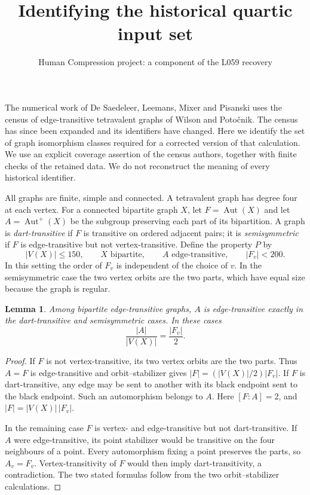 \documentclass[11pt,a4paper]{article}
\title{Identifying the historical quartic input set}
\author{Human Compression project: a component of the L059 recovery}
\date{}
\newtheorem{lemma}{Lemma}
\begin{document}
\maketitle

The numerical work of De Saedeleer, Leemans, Mixer and Pisanski
\cite{l059} uses the census of edge-transitive tetravalent graphs
of Wilson and Poto\v cnik. The census has since been expanded and its
identifiers have changed. Here we identify the set of graph isomorphism
classes required for a corrected version of that calculation. We use
an explicit coverage assertion of the census authors, together with
finite checks of the retained data. We do not reconstruct the meaning
of every historical identifier.

All graphs are finite, simple and connected. A tetravalent graph has
degree four at each vertex. For a connected bipartite graph $X$, let
$F=\operatorname{Aut}(X)$ and let $A=\operatorname{Aut}^{+}(X)$ be
the subgroup preserving each part of its bipartition. A graph is
\emph{dart-transitive} if $F$ is transitive on ordered adjacent pairs;
it is \emph{semisymmetric} if $F$ is edge-transitive but not
vertex-transitive. Define the property $P$ by
\[
 |V(X)|\leq150,\qquad X\text{ bipartite},\qquad
 A\text{ edge-transitive},\qquad |F_v|<200.
 \tag{1}
\]
In this setting the order of $F_v$ is independent of the choice of
$v$. In the semisymmetric case the two vertex orbits are the two
parts, which have equal size because the graph is regular.

\begin{lemma}
Among bipartite edge-transitive graphs, $A$ is edge-transitive
exactly in the dart-transitive and semisymmetric cases. In these
cases
\[
                    \frac{|A|}{|V(X)|}=\frac{|F_v|}{2}.
\]
\end{lemma}
\begin{proof}
If $F$ is not vertex-transitive, its two vertex orbits are the two
parts. Thus $A=F$ is edge-transitive and orbit--stabilizer gives
$|F|=(|V(X)|/2)|F_v|$. If $F$ is dart-transitive, any edge may be
sent to another with its black endpoint sent to the black endpoint.
Such an automorphism belongs to $A$. Here $[F:A]=2$, and
$|F|=|V(X)|\,|F_v|$.

In the remaining case $F$ is vertex- and edge-transitive but not
dart-transitive. If $A$ were edge-transitive, its point stabilizer
would be transitive on the four neighbours of a point. Every
automorphism fixing a point preserves the parts, so $A_v=F_v$.
Vertex-transitivity of $F$ would then imply dart-transitivity,
a contradiction. The two stated formulas follow from the two
orbit--stabilizer calculations.
\end{proof}
\end{document}

